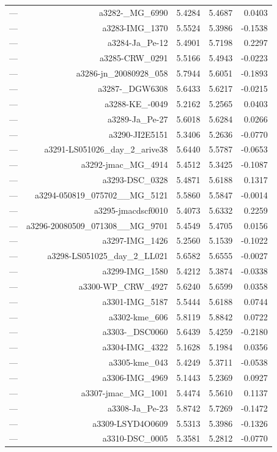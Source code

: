 \begin{table}[htbp]
\begin{tabular}{lrrrr}
— & a3282-_MG_6990 & 5.4284 & 5.4687 & 0.0403 \\
— & a3283-IMG_1370 & 5.5524 & 5.3986 & -0.1538 \\
— & a3284-Ja_Pe-12 & 5.4901 & 5.7198 & 0.2297 \\
— & a3285-CRW_0291 & 5.5166 & 5.4943 & -0.0223 \\
— & a3286-jn_20080928_058 & 5.7944 & 5.6051 & -0.1893 \\
— & a3287-_DGW6308 & 5.6433 & 5.6217 & -0.0215 \\
— & a3288-KE_-0049 & 5.2162 & 5.2565 & 0.0403 \\
— & a3289-Ja_Pe-27 & 5.6018 & 5.6284 & 0.0266 \\
— & a3290-JI2E5151 & 5.3406 & 5.2636 & -0.0770 \\
— & a3291-LS051026_day_2_arive38 & 5.6440 & 5.5787 & -0.0653 \\
— & a3292-jmac_MG_4914 & 5.4512 & 5.3425 & -0.1087 \\
— & a3293-DSC_0328 & 5.4871 & 5.6188 & 0.1317 \\
— & a3294-050819_075702__MG_5121 & 5.5860 & 5.5847 & -0.0014 \\
— & a3295-jmacdscf0010 & 5.4073 & 5.6332 & 0.2259 \\
— & a3296-20080509_071308__MG_9701 & 5.4549 & 5.4705 & 0.0156 \\
— & a3297-IMG_1426 & 5.2560 & 5.1539 & -0.1022 \\
— & a3298-LS051025_day_2_LL021 & 5.6582 & 5.6555 & -0.0027 \\
— & a3299-IMG_1580 & 5.4212 & 5.3874 & -0.0338 \\
— & a3300-WP_CRW_4927 & 5.6240 & 5.6599 & 0.0358 \\
— & a3301-IMG_5187 & 5.5444 & 5.6188 & 0.0744 \\
— & a3302-kme_606 & 5.8119 & 5.8842 & 0.0722 \\
— & a3303-_DSC0060 & 5.6439 & 5.4259 & -0.2180 \\
— & a3304-IMG_4322 & 5.1628 & 5.1984 & 0.0356 \\
— & a3305-kme_043 & 5.4249 & 5.3711 & -0.0538 \\
— & a3306-IMG_4969 & 5.1443 & 5.2369 & 0.0927 \\
— & a3307-jmac_MG_1001 & 5.4474 & 5.5610 & 0.1137 \\
— & a3308-Ja_Pe-23 & 5.8742 & 5.7269 & -0.1472 \\
— & a3309-LSYD4O0609 & 5.5313 & 5.3986 & -0.1326 \\
— & a3310-DSC_0005 & 5.3581 & 5.2812 & -0.0770 \\

\end{tabular}
\end{table}
